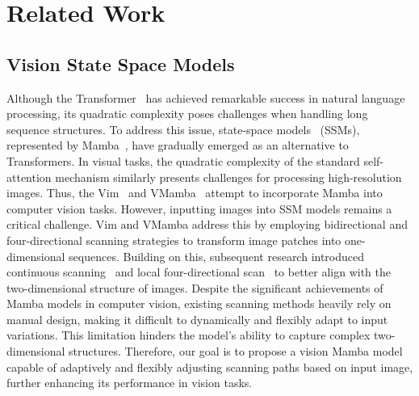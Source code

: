 \section{Related Work}
\subsection{Vision State Space Models}
Although the Transformer~\cite{transfomer} has achieved remarkable success in natural language processing, its quadratic complexity poses challenges when handling long sequence structures. To address this issue, state-space models~\cite{s4} (SSMs), represented by Mamba~\cite{mamba}, have gradually emerged as an alternative to Transformers. In visual tasks, the quadratic complexity of the standard self-attention mechanism similarly presents challenges for processing high-resolution images. Thus, the Vim~\cite{vim} and VMamba~\cite{vmamba} attempt to incorporate Mamba into computer vision tasks. However, inputting images into SSM models remains a critical challenge. Vim and VMamba address this by employing bidirectional and four-directional scanning strategies to transform image patches into one-dimensional sequences. Building on this, subsequent research introduced continuous scanning~\cite{plainmamba} and local four-directional scan~\cite{localmamba} to better align with the two-dimensional structure of images. Despite the significant achievements of Mamba models in computer vision, existing scanning methods heavily rely on manual design, making it difficult to dynamically and flexibly adapt to input variations. This limitation hinders the model's ability to capture complex two-dimensional structures. Therefore, our goal is to propose a vision Mamba model capable of adaptively and flexibly adjusting scanning paths based on input image, further enhancing its performance in vision tasks.


